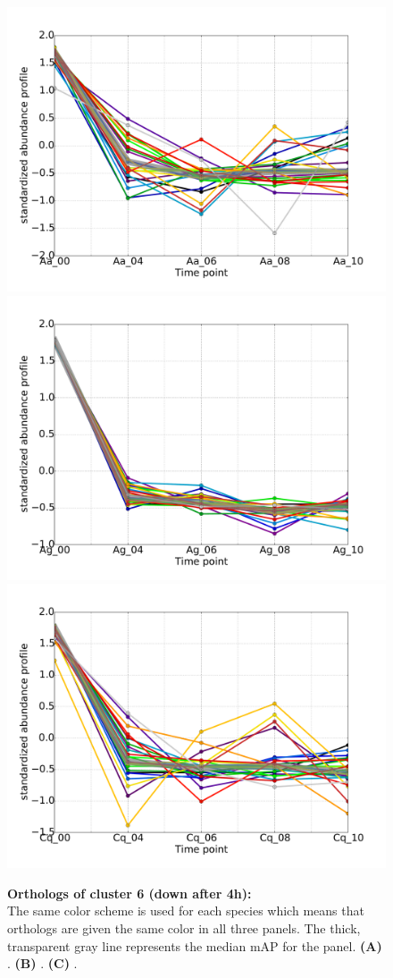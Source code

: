 
\begin{figure}[hp]
% 
\subcaptionbox{\label{fig:cluster6-Aa}}
{\includegraphics[width=.5\linewidth]{figures/figs/ecr_and_insects_ptci_20130918_orthodb7/downAfter4_gene_profiles_from_cummerbund/Aa_downAfter4_cls6_Ag_target_FPKMs_vb_orthos.pdf}}
%
\subcaptionbox{\label{fig:cluster6-Ag}}
{\includegraphics[width=.5\linewidth]{figures/figs/ecr_and_insects_ptci_20130918_orthodb7/downAfter4_gene_profiles_from_cummerbund/Ag_downAfter4_cls6_Ag_target_FPKMs_vb_orthos.pdf}}
%
\subcaptionbox{\label{fig:cluster6-Cq}}
{\includegraphics[width=.5\linewidth]{figures/figs/ecr_and_insects_ptci_20130918_orthodb7/downAfter4_gene_profiles_from_cummerbund/Cq_downAfter4_cls6_Ag_target_FPKMs_vb_orthos.pdf}}
% 
\caption[Orthologs of cluster 6]{\sf \textbf{Orthologs of cluster 6 (down after 4h):}\\
The same color scheme is used for each species which means that orthologs are given the same color in all three panels.
The thick, transparent gray line represents the median \gls{mAP} for the panel.
\textbf{(A)} \Aa.
\textbf{(B)} \Ag.
\textbf{(C)} \Cq.
}\label{fig:cluster6}
\end{figure}